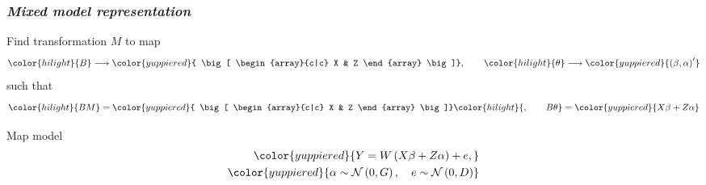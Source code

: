 \documentclass[12pt]{beamer}
\newcommand{\newmaththought}[1]{{ \color{hilight} {#1}}}
\newcommand{\mixedmodelmath}[1]{{ \color{yuppiered} {#1}}}
\begin{document}
\begin{frame}
\frametitle{\emph{Mixed model representation}}

Find transformation $M$ to map
\begin{equation*}
\newmaththought{B} \longrightarrow \mixedmodelmath{ \big[ \begin{array}{c|c} X & Z \end{array}  \big]}, \qquad \newmaththought{\theta} \longrightarrow \mixedmodelmath{\left( \beta, \alpha \right)^\prime}
\end{equation*}
\noindent
such that 
\begin{equation*}
\newmaththought{BM} =\mixedmodelmath{ \big[ \begin{array}{c|c} X & Z \end{array}  \big]}\newmaththought{, \qquad B \theta} = \mixedmodelmath{X \beta + Z \alpha}
\end{equation*}


Map model 
\begin{align} 
\begin{split} \label{eq:vc-mixed-effects-model}
\mixedmodelmath{Y = W\left(X \beta + Z \alpha\right) + e, }\\
\mixedmodelmath{ \alpha \sim \mathcal{N}\left(0,G \right), \quad e\sim\mathcal{N}\left(0, D \right)}
\end{split}
\end{align} 

\end{frame}
\end{document}
